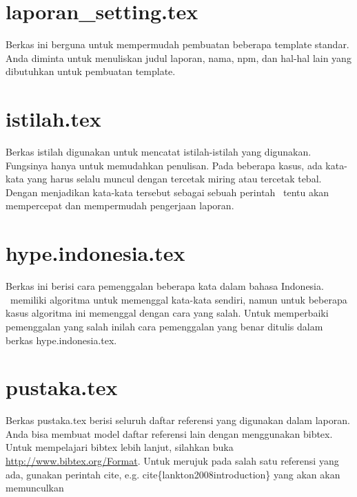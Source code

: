     \section{laporan\_setting.tex}
    Berkas ini berguna untuk mempermudah pembuatan beberapa template standar.
    Anda diminta untuk menuliskan judul laporan, nama, npm, dan hal-hal lain yang
    dibutuhkan untuk pembuatan template.


    \section{istilah.tex}
    Berkas istilah digunakan untuk mencatat istilah-istilah yang digunakan.
    Fungsinya hanya untuk memudahkan penulisan.
    Pada beberapa kasus, ada kata-kata yang harus selalu muncul dengan tercetak
    miring atau tercetak tebal.
    Dengan menjadikan kata-kata tersebut sebagai sebuah perintah \latex~tentu akan
    mempercepat dan mempermudah pengerjaan laporan.


    \section{hype.indonesia.tex}
    Berkas ini berisi cara pemenggalan beberapa kata dalam bahasa Indonesia.
    \latex~memiliki algoritma untuk memenggal kata-kata sendiri, namun untuk
    beberapa kasus algoritma ini memenggal dengan cara yang salah.
    Untuk memperbaiki pemenggalan yang salah inilah cara pemenggalan yang benar
    ditulis dalam berkas hype.indonesia.tex.


    \section{pustaka.tex}
    Berkas pustaka.tex berisi seluruh daftar referensi yang digunakan dalam
    laporan.
    Anda bisa membuat model daftar referensi lain dengan menggunakan bibtex.
    Untuk mempelajari bibtex lebih lanjut, silahkan buka
    \url{http://www.bibtex.org/Format}.
    Untuk merujuk pada salah satu referensi yang ada, gunakan perintah \bslash
    cite, e.g. \bslash cite\{lankton2008introduction\} yang akan akan memunculkan
    \cite{lankton2008introduction}


